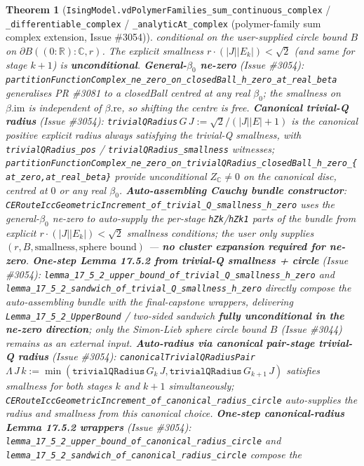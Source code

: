 \documentclass[a4paper,11pt]{article}
\newtheorem{theorem}{Theorem}
\begin{document}
\begin{theorem}[\texttt{IsingModel.vdPolymerFamilies\_sum\_continuous\_complex} /
\texttt{\_differentiable\_complex} / \texttt{\_analyticAt\_complex} (polymer-family sum
complex extension, Issue \#3054)]
conditional on the user-supplied circle bound \(B\) on
\(\partial B((0:\mathbb{R}):\mathbb{C},r)\). The explicit smallness
\(r\cdot(|J||E_k|)<\sqrt{2}\) (and same for stage \(k+1\)) is \textbf{unconditional}.
\textbf{General-\(\beta_0\) ne-zero} (Issue \#3054):
\texttt{partitionFunctionComplex\_ne\_zero\_on\_closedBall\_h\_zero\_at\_real\_beta}
generalises PR \#3081 to a closedBall centred at any real \(\beta_0\); the
smallness on \(\beta.\mathrm{im}\) is independent of \(\beta.\mathrm{re}\), so
shifting the centre is free.
\textbf{Canonical trivial-Q radius} (Issue \#3054):
\texttt{trivialQRadius}\(\,G\,J:=\sqrt{2}/(|J||E|+1)\) is the canonical
positive explicit radius always satisfying the trivial-Q smallness, with
\texttt{trivialQRadius\_pos} / \texttt{trivialQRadius\_smallness} witnesses;
\texttt{partitionFunctionComplex\_ne\_zero\_on\_trivialQRadius\_closedBall\_h\_zero\_\{at\_zero,at\_real\_beta\}}
provide unconditional \(Z_{\mathbb{C}}\ne0\) on the canonical disc, centred at
\(0\) or any real \(\beta_0\).
\textbf{Auto-assembling Cauchy bundle constructor}:
\texttt{CERouteIccGeometricIncrement\_of\_trivial\_Q\_smallness\_h\_zero} uses
the general-\(\beta_0\) ne-zero to auto-supply the per-stage
\texttt{hZk}/\texttt{hZk1} parts of the bundle from explicit
\(r\cdot(|J||E_k|)<\sqrt{2}\) smallness conditions; the user only supplies
\((r,B,\text{smallness},\text{sphere bound})\) — \textbf{no cluster expansion
required for ne-zero}.
\textbf{One-step Lemma 17.5.2 from trivial-Q smallness + circle} (Issue \#3054):
\texttt{lemma\_17\_5\_2\_upper\_bound\_of\_trivial\_Q\_smallness\_h\_zero} and
\texttt{lemma\_17\_5\_2\_sandwich\_of\_trivial\_Q\_smallness\_h\_zero} directly
compose the auto-assembling bundle with the final-capstone wrappers, delivering
\texttt{Lemma\_17\_5\_2\_UpperBound} / two-sided sandwich
\textbf{fully unconditional in the ne-zero direction}; only the Simon-Lieb
sphere circle bound \(B\) (Issue \#3044) remains as an external input.
\textbf{Auto-radius via canonical pair-stage trivial-Q radius} (Issue \#3054):
\texttt{canonicalTrivialQRadiusPair}\(\Lambda\,J\,k:=\min(\texttt{trivialQRadius}\,G_k\,J,\texttt{trivialQRadius}\,G_{k+1}\,J)\)
satisfies smallness for both stages \(k\) and \(k+1\) simultaneously;
\texttt{CERouteIccGeometricIncrement\_of\_canonical\_radius\_circle}
auto-supplies the radius and smallness from this canonical choice.
\textbf{One-step canonical-radius Lemma 17.5.2 wrappers} (Issue \#3054):
\texttt{lemma\_17\_5\_2\_upper\_bound\_of\_canonical\_radius\_circle} and
\texttt{lemma\_17\_5\_2\_sandwich\_of\_canonical\_radius\_circle} compose the

\end{theorem}
\end{document}
